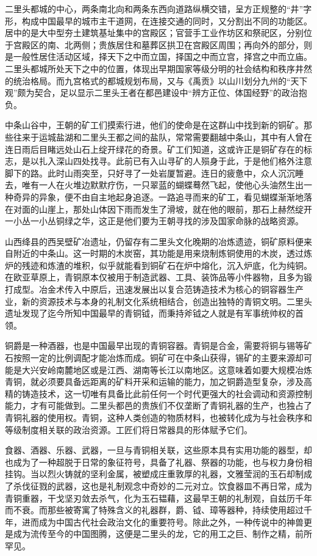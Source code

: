 二里头都城的中心，两条南北向和两条东西向道路纵横交错，呈方正规整的“井”字形，构成中国最早的城市主干道网，在连接交通的同时，又分割出不同的功能区。居中的是大中型夯土建筑基址集中的宫殿区；官营手工业作坊区和祭祀区，分别位于宫殿区的南、北两侧；贵族居住和墓葬区拱卫在宫殿区周围；再向外的部分，则是一般性居住活动区域，择天下之中而立国，择国之中而立宫，择宫之中而立庙。二里头都城所处天下之中的位置，体现出早期国家等级分明的社会结构和秩序井然的统治格局。而九宫格式的都城规划布局，又与《禹贡》以山川划分九州的“天下观”颇为契合，足以显示二里头王者在都邑建设中“辨方正位、体国经野”的政治抱负。

中条山谷中，王朝的矿工们摸索行进，他们的使命是在这群山中找到新的铜矿。那些往来于运城盐湖和二里头王都之间的盐队，常常需要翻越中条山，其中有人曾在连日雨后目睹远处山石上绽开绿花的奇景。矿工们知道，这或许正是铜矿存在的标志，是以扎入深山四处找寻。此前已有入山寻矿的人殒身于此，于是他们格外注意脚下的路。此时山雨突至，只好寻了一处岩厦暂避。连日的疲惫中，众人沉沉睡去，唯有一人在火堆边默默疗伤，一只翠蓝的蝴蝶蓦然飞起，使他心头油然生出一种奇异的异象，便不由自主地起身追逐。一路追寻而来的矿工，看见蝴蝶渐渐地落在对面的山崖上，那处山体因下雨而发生了滑坡，就在他的眼前，那石上赫然绽开一小丛一小丛铜绿之华，这正是他们要为王朝寻找的涉及国家命脉的战略资源。

山西绛县的西吴壁矿冶遗址，仍留存有二里头文化晚期的冶炼遗迹，铜矿原料便来自附近的中条山。这一时期的木炭窑，其功能是用来烧制炼铜使用的木炭，透过炼炉的残迹和炼渣的堆积，似乎就能看到铜矿石在炉中熔化，沉入炉底，化为纯铜。在欧亚草原上，青铜原本仅被用于制造武器、工具、装饰品等小件器物，且多为锻打成型。冶金术传入中原后，迅速发展出以复合范铸造技术为核心的铜容器生产业，新的资源技术与本身的礼制文化系统相结合，创造出独特的青铜文明。二里头遗址发现了迄今所知中国最早的青铜钺，而秉持斧钺之人就是有军事统帅权的首领。

铜爵是一种酒器，也是中国最早出现的青铜容器。青铜是合金，需要将铜与锡等矿石按照一定的比例调配才能冶炼而成。铜矿可在中条山获得，锡矿的主要来源却可能是大兴安岭南麓地区或是江西、湖南等长江以南地区。这意味着如要大规模冶炼青铜，就必须要具备远距离的矿料开采和运输的能力，加之铜爵造型复杂，涉及高精的铸造技术，这一切唯有具备比此前任何一个时代更强大的社会调动和资源控制能力，才有可能做到。二里头都邑的贵族们不仅垄断了青铜礼器的生产，也独占了青铜礼器的使用权。青铜，这种人类创造的物质材料，也被转化成为与社会秩序和等级制度相关联的政治资源。工匠们将日常器具的形体赋予它们。

食器、酒器、乐器、武器，一旦与青铜相关联，这些原本具有实用功能的器型，却也成为了一种超脱于日常的象征符号，具备了礼器、祭器的功能，也与权力身份相挂钩。当以烈火铸就的坚利金属，被塑成庄重敦厚的礼器，文雅莹润的玉石却制成了杀伐征戮的武器，这也是礼制观念中奇妙的二元对立。饮食器皿不再日常，成为青铜重器，干戈坚刃敛去杀气，化为玉石韫藉，这最早王朝的礼制观，自兹历千年而不衰。而那些被寄寓了特殊含义的礼器群，爵、钺、璋等器种，持续使用超过千年，进而成为中国古代社会政治文化的重要符号。除此之外，一种传说中的神兽更是成为流传至今的中国图腾，这便是二里头的龙，它的用工之巨、制作之精，前所罕见。

